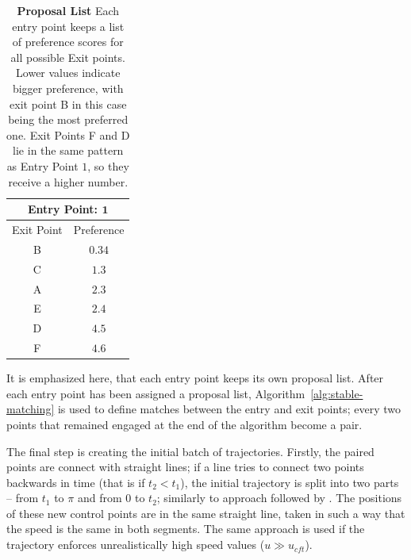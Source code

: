\begin{table}[b]
	\centering
	\caption{
	\textbf{Proposal List} Each entry point keeps a list of preference scores for all possible Exit points.
	Lower values indicate bigger preference, with exit point B in this case being the most preferred one.
	Exit Points F and D lie in the same pattern as Entry Point $1$, so they receive a higher number.
	}
	\begin{tabular}{|c|c|}
		\hline
		\multicolumn{2}{|c|}{\textbf{Entry Point: } $\mathbf{1}$}	\\
 		\hline
 		\hline
		Exit Point	&	Preference\\
		\hline
		\rowcolor[gray]{0.9}B	&	$\mathbf{0.34}$	\\
		C	&	$1.3$			\\
		A	&	$2.3$			\\
		E	&	$2.4$			\\
		D	&	$4.5$			\\
		F	&	$4.6$			\\
		\hline
		\end{tabular}
	\label{tab:proposal-list}
\end{table}

It is emphasized here, that each entry point keeps its own proposal list.
After each entry point has been assigned a proposal list, Algorithm~\ref{alg:stable-matching} is used to define matches between the entry and exit points;
every two points that remained engaged at the end of the algorithm become a pair.

The final step is creating the initial batch of trajectories.
Firstly, the paired points are connect with straight lines;
if a line tries to connect two points backwards in time (that is if $t_2 < t_1$), the initial trajectory is split into two parts -- from $t_1$ to $\pi$ and from $0$ to $t_2$; similarly to approach followed by \cite{Yersin:2009}.
The positions of these new control points are in the same straight line, taken in such a way that the speed is the same in both segments.
The same approach is used if the trajectory enforces unrealistically high speed values ($u \gg u_{cft}$).

